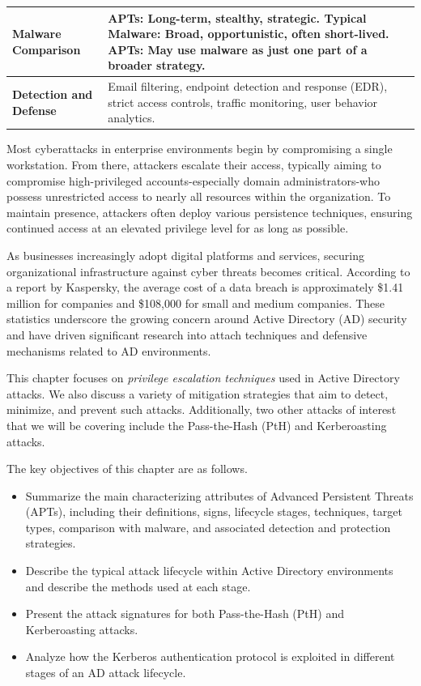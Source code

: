 {\begin{longtable}{|p{4cm}|p{11cm}|}
\textbf{Malware Comparison} &
\textbf{APTs:} Long-term, stealthy, strategic. \newline
\textbf{Typical Malware:} Broad, opportunistic, often short-lived. \newline
\textbf{APTs:} May use malware as just one part of a broader strategy. \\
\hline

\textbf{Detection and Defense} &
Email filtering, endpoint detection and response (EDR), strict access controls, traffic monitoring, user behavior analytics. \\
\hline
\end{longtable}

Most cyberattacks in enterprise environments begin by compromising a single workstation. From there, attackers escalate their access, typically aiming to compromise high-privileged accounts-especially domain administrators-who possess unrestricted access to nearly all resources within the organization. To maintain presence, attackers often deploy various persistence techniques, ensuring continued access at an elevated privilege level for as long as possible.

As businesses increasingly adopt digital platforms and services, securing organizational infrastructure against cyber threats becomes critical. According to a report by Kaspersky, the average cost of a data breach is approximately \$1.41 million for companies and \$108,000 for small and medium companies. These statistics underscore the growing concern around Active Directory (AD) security and have driven significant research into attach techniques and defensive mechanisms related to AD environments.

This chapter focuses on \textit{privilege escalation techniques} used in Active Directory attacks. We also discuss a variety of mitigation strategies that aim to detect, minimize, and prevent such attacks. Additionally, two other attacks of interest that we will be covering include the Pass-the-Hash (PtH) and Kerberoasting attacks.

The key objectives of this chapter are as follows.
\begin{itemize}
    \item Summarize the main characterizing attributes of Advanced Persistent Threats (APTs), including their definitions, signs, lifecycle stages, techniques, target types, comparison with malware, and associated detection and protection strategies.
    \item Describe the typical attack lifecycle within Active Directory environments and describe the methods used at each stage.
    \item Present the attack signatures for both Pass-the-Hash (PtH) and Kerberoasting attacks.
    \item Analyze how the Kerberos authentication protocol is exploited in different stages of an AD attack lifecycle.
\end{itemize}

}
